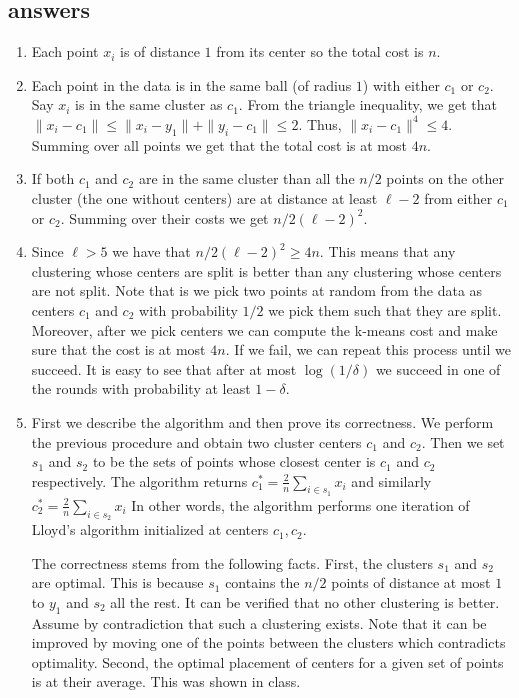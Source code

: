 \documentclass{article}
\begin{document}
\subsection*{answers}
\begin{enumerate}
\item Each point $x_i$ is of distance $1$ from its center so the total cost is $n$.
\item Each point in the data is in the same ball (of radius $1$) with either $c_1$ or $c_2$. 
Say $x_i$ is in the same cluster as $c_1$.
From the triangle inequality, we get that 
$\|x_i -c_1\| \le \|x_i -y_1\| + \|y_i -c_1\|  \le 2$. Thus,  $\|x_i -c_1\|^4 \le 4$. 
Summing over all points we get that the total cost is at most $4n$.
\item If both $c_1$ and $c_2$ are in the same cluster than all the $n/2$ points on the other cluster (the one without centers) are
at distance at least $\ell-2$ from either $c_1$ or $c_2$. Summing over their costs we get $n/2(\ell -2)^2$.

\item Since $\ell > 5$ we have that $n/2(\ell -2)^2 \ge 4n$. 
This means that any clustering whose centers are split is better than any clustering whose centers are not split. 
Note that is we pick two points at random from the data as centers $c_1$ and $c_2$ with probability $1/2$ we pick them such that they are split.
Moreover, after we pick centers we can compute the k-means cost and make sure that the cost is at most $4n$.
If we fail, we can repeat this process until we succeed. 
It is easy to see that after at most $\log(1/\delta)$ we succeed in one of the rounds with probability at least $1-\delta$.

\item First we describe the algorithm and then prove its correctness.
We perform the previous procedure and obtain two cluster centers $c_1$ and $c_2$.
Then we set $s_1$ and $s_2$ to be the sets of points whose closest center is $c_1$ and $c_2$ respectively. 
The algorithm returns $c^{*}_1 = \frac{2}{n} \sum_{i \in s_1} x_i$ and similarly $c^{*}_2 = \frac{2}{n} \sum_{i \in s_2} x_i$
In other words, the algorithm performs one iteration of Lloyd's algorithm initialized at centers $c_1,c_2$.

The correctness stems from the following facts. First, the clusters $s_1$ and $s_2$ are optimal.
This is because $s_1$ contains the $n/2$ points of distance at most $1$ to $y_1$ and $s_2$ all the rest.
It can be verified that no other clustering is better. Assume by contradiction that such a clustering exists.
Note that it can be improved by moving one of the points between the clusters which contradicts optimality.
Second, the optimal placement of centers for a given set of points is at their average. This was shown in class.

\end{enumerate}
\pagebreak

\end{document}
